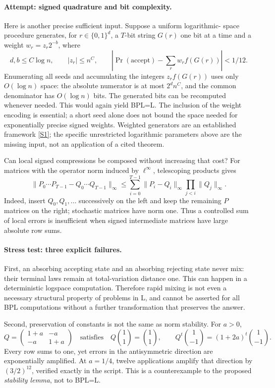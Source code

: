 \documentclass[11pt,a4paper]{article}
\newcommand{\sref}[2]{\hyperlink{source:#1:#2}{[S#2]}}
\numberwithin{equation}{section}
\begin{document}
\paragraph{Attempt: signed quadrature and bit complexity.}
Here is another precise sufficient input. Suppose a uniform logarithmic-
space procedure generates, for $r\in\{0,1\}^d$, a $T$-bit string $G(r)$
one bit at a time and a weight $w_r=z_r2^{-b}$, where
\[
 d,b\le C\log n,\qquad |z_r|\le n^C,
 \qquad
 \left|\Pr(\mathrm{accept})-\sum_r w_r f(G(r))\right|<1/12.
\]
Enumerating all seeds and accumulating the integers $z_rf(G(r))$ uses
only $O(\log n)$ space: the absolute numerator is at most
$2^d n^C$, and the common denominator has $O(\log n)$ bits. The generated
bits can be recomputed whenever needed. This would again yield BPL=L.
The inclusion of the weight encoding is essential; a short seed alone
does not bound the space needed for exponentially precise signed weights.
Weighted generators are an established framework \sref{163}{1}; the
specific unrestricted logarithmic parameters above are the missing input,
not an application of a cited theorem.

Can local signed compressions be composed without increasing that cost?
For matrices with the operator norm induced by $\ell^\infty$, telescoping
products gives
\begin{equation}\label{163:product-error}
 \|P_0\cdots P_{T-1}-Q_0\cdots Q_{T-1}\|_\infty
 \le\sum_{i=0}^{T-1}
       \|P_i-Q_i\|_\infty
       \prod_{j<i}\|Q_j\|_\infty.
\end{equation}
Indeed, insert $Q_0, Q_1,\ldots$ successively on the left and keep the
remaining $P$ matrices on the right; stochastic matrices have norm one.
Thus a controlled sum of local errors is insufficient when signed
intermediate matrices have large absolute row sums.

\paragraph{Stress test: three explicit failures.}
First, an absorbing accepting state and an absorbing rejecting state
never mix: their terminal laws remain at total-variation distance one.
This can happen in a deterministic logspace computation. Therefore
rapid mixing is not even a necessary structural property of problems in
L, and cannot be asserted for all BPL computations without a further
transformation that preserves the answer.

Second, preservation of constants is not the same as norm stability.
For $a>0$,
\[
 Q=\begin{pmatrix}1+a&-a\\-a&1+a\end{pmatrix}
 \quad\text{satisfies}\quad
 Q\binom11=\binom11,
 \qquad Q^t\binom1{-1}=(1+2a)^t\binom1{-1}.
\]
Every row sums to one, yet errors in the antisymmetric direction are
exponentially amplified. At $a=1/4$, twelve applications amplify that
direction by $(3/2)^{12}$, verified exactly in the script. This is a
counterexample to the proposed \emph{stability lemma}, not to BPL=L.
\end{document}

